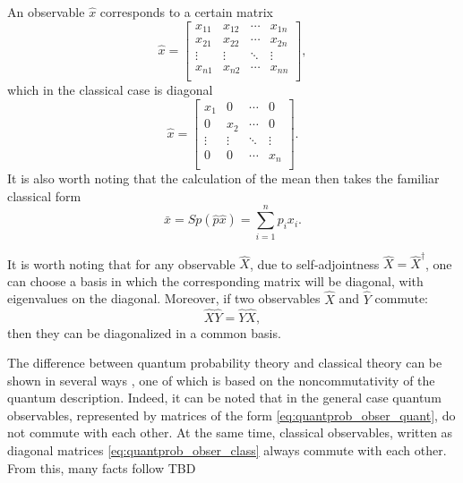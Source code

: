 An observable $\hat{x}$ corresponds to a certain matrix
\begin{equation}
\hat{x} = \begin{bmatrix}
x_{11} & x_{12} & \cdots & x_{1n} \\
x_{21} & x_{22} & \cdots & x_{2n} \\
\vdots & \vdots & \ddots & \vdots \\
x_{n1} & x_{n2} & \cdots & x_{nn} \\
\end{bmatrix},
\label{eq:quantprob_obser_quant}
\end{equation}
which in the classical case is diagonal 
\begin{equation}
\hat{x} = \begin{bmatrix}
x_1 & 0 & \cdots & 0 \\
0 & x_2 & \cdots & 0 \\
\vdots & \vdots & \ddots & \vdots \\
0 & 0 & \cdots & x_n \\
\end{bmatrix}.
\label{eq:quantprob_obser_class}
\end{equation}
It is also worth noting that the calculation of the mean then takes the familiar classical form
\begin{equation}
\bar{x} = Sp\left(\hat{p} \hat{x}\right) = \sum_{i=1}^n p_i x_i.
\nonumber
\end{equation}
\begin{remark}
  It is worth noting that for any observable $\hat{X}$, due to
  self-adjointness $\hat{X} = \hat{X}^\dag$, one can choose
  a basis in which the corresponding matrix will be diagonal, with
  eigenvalues on the diagonal. Moreover, if two
  observables $\hat{X}$ and $\hat{Y}$ commute:  
  \[
  \hat{X} \hat{Y} = \hat{Y} \hat{X},
  \]
  then they can be diagonalized in a common basis.
\end{remark}

The difference between quantum probability theory and classical theory can be
shown in several ways \cite{bHolevo2003, bHolevo2003add},
one of which is based on the noncommutativity of the quantum description.
Indeed, it can be noted that in the general case quantum observables,
represented by matrices of the form \eqref{eq:quantprob_obser_quant}, do not
commute with each other. At the same time, classical observables,
written as diagonal matrices
\eqref{eq:quantprob_obser_class} always commute with each other. From
this, many facts follow TBD


